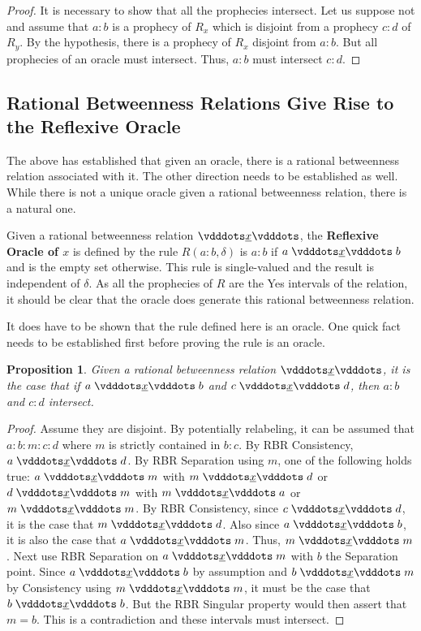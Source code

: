 \documentclass[12pt]{article}
\newtheorem{proposition}{Proposition}[section]
\begin{document}
\begin{proof}
    It is necessary to show that all the prophecies intersect. Let us suppose not and assume that $a:b$ is a prophecy of $R_x$ which is disjoint  from a prophecy $c:d$ of $R_y$. By the hypothesis, there is a prophecy of $R_x$ disjoint from $a:b$. But all prophecies of an oracle must intersect. Thus, $a:b$ must intersect $c:d$.
\end{proof}



\subsection{Rational Betweenness Relations Give Rise to the Reflexive Oracle}

The above has established that given an oracle, there is a rational betweenness relation associated with it. The other direction needs to be established as well. While there is not a unique oracle given a rational betweenness relation, there is a natural one. 

Given a rational betweenness relation $\xrel$, the \textbf{Reflexive Oracle of $x$} is defined by the rule $R(a:b, \delta)$ is $a:b$ if $a \xrel b$ and is the empty set otherwise. This rule is single-valued and the result is independent of $\delta$. As all the prophecies of $R$ are the Yes intervals of the relation, it should be clear that the oracle does generate this rational betweenness relation. 

It does have to be shown that the rule defined here is an oracle. One quick fact needs to be established first before proving the rule is an oracle. 

\begin{proposition}
    Given a rational betweenness relation $\xrel$, it is the case that if $a \xrel b$ and $c \xrel d$, then $a:b$ and $c:d$ intersect. 
\end{proposition}

\begin{proof}
    Assume they are disjoint. By potentially relabeling, it can be assumed that $a:b:m:c:d$ where $m$ is strictly contained in $b:c$. By RBR Consistency, $a \xrel d$. By RBR Separation using $m$, one of the following holds true: $a \xrel m$ with \sout{$m \xrel d$} or $d \xrel m$ with \sout{$m \xrel a$} or $m \xrel m$. By RBR Consistency, since $c \xrel d$, it is the case that $m \xrel d$. Also since $a \xrel b$, it is also the case that $a \xrel m$. Thus, $m \xrel m$. Next use RBR Separation on $a \xrel m$ with $b$ the Separation point. Since $a \xrel b$ by assumption and $b \xrel m$ by Consistency using $m \xrel m$, it must be the case that $b \xrel b$. But the RBR Singular property would then assert that $m = b$. This is a contradiction and these intervals must intersect. 
\end{proof}
\end{document}
